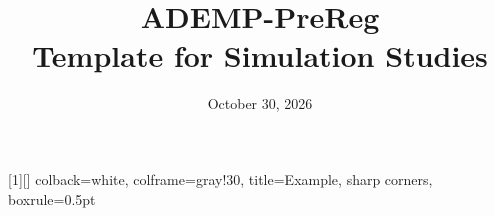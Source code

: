 \usepackage[english]{babel}

\title{\textbf{\textsf{ADEMP-PreReg \\ Template for Simulation Studies}}}
\date{October 30, 2026}
\author{}

\usepackage{amsmath, amssymb}

\usepackage[style=apa, backend=biber]{biblatex}


\usepackage{helvet}
\usepackage{sectsty}
\allsectionsfont{\sffamily} %

\usepackage{geometry}

\setlength{\parindent}{0cm}

\usepackage{hyperref} %
\usepackage{color}    %
\hypersetup{
  colorlinks = true, %
  urlcolor   = pigment, %
  linkcolor  = black, %
  citecolor  = pigment %
}

\usepackage{fancyhdr}
\pagestyle{fancy}
\chead{}
\rhead{}


\usepackage{tcolorbox}
[1][]{                                                                     colback=white,                                                                                  colframe=gray!30,                                                                               title=Example,                                                                                  sharp corners,                                                                                  boxrule=0.5pt                     
}

\newcommand*{\fakebreak}{\par\vspace{\baselineskip}\pagebreak[4]}
  
